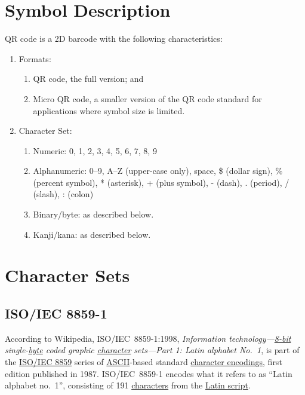 \section{Symbol Description}

QR code is a 2D barcode with the following characteristics:

\begin{enumerate}
  \item Formats:
    \begin{enumerate}[label=\alph*.]
      \item QR code, the full version; and
      \item Micro QR code, a smaller version of the QR code standard for applications where symbol size is limited.
    \end{enumerate}
  \item Character Set\cite{wikipedia-qr}:
    \begin{enumerate}[label=\alph*.]
      \item Numeric: 0, 1, 2, 3, 4, 5, 6, 7, 8, 9
      \item Alphanumeric: 0–9, A–Z (upper-case only), space, \$ (dollar sign), \% (percent symbol), * (asterisk), + (plus symbol), - (dash), . (period), / (slash), : (colon) 
      \item Binary/byte:  as described below.
      \item Kanji/kana:  as described below.
    \end{enumerate}
\end{enumerate}

\section{Character Sets}

\subsection{ISO/IEC 8859-1}
\label{sec:ISO/IEC 8859-1}

According to Wikipedia, ISO/IEC~8859-1:1998, \emph{Information technology---\href{https://en.wikipedia.org/wiki/8-bit_computing}{8-bit} single-\href{https://en.wikipedia.org/wiki/Byte}{byte} coded graphic \href{https://en.wikipedia.org/wiki/Character_(computing)}{character} sets---Part 1: Latin alphabet No.~1}, is part of the \href{https://en.wikipedia.org/wiki/ISO/IEC_8859}{ISO/IEC 8859} series of \href{https://en.wikipedia.org/wiki/ASCII}{ASCII}-based standard \href{https://en.wikipedia.org/wiki/Character_encoding}{character encodings}, first edition published in 1987. ISO/IEC~8859-1 encodes what it refers to as ``Latin alphabet no.~1'', consisting of 191 \href{https://en.wikipedia.org/wiki/Character_(computing)}{characters} from the \href{https://en.wikipedia.org/wiki/Latin_script}{Latin script}\cite{wikipedia-ISO-8859-1}.


